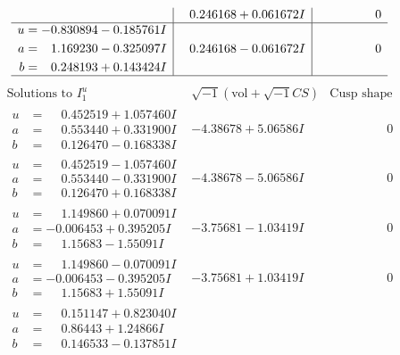 \documentclass[1p]{elsarticle_modified}
\theoremstyle{definition}
\newcommand{\I}{\sqrt{-1}}
\begin{document}
$$\begin{array}{c|c|c}
 & \phantom{-}0.246168 + 0.061672 I & \phantom{-0.000000 } 0 \\ \hline\begin{aligned}
u &= -0.830894 - 0.185761 I \\
a &= \phantom{-}1.169230 - 0.325097 I \\
b &= \phantom{-}0.248193 + 0.143424 I\end{aligned}
 & \phantom{-}0.246168 - 0.061672 I & \phantom{-0.000000 } 0\\
 \hline 
 \end{array}$$\newpage$$\begin{array}{c|c|c}  
\text{Solutions to }I^u_{1}& \I (\text{vol} + \sqrt{-1}CS) & \text{Cusp shape}\\
 \hline 
\begin{aligned}
u &= \phantom{-}0.452519 + 1.057460 I \\
a &= \phantom{-}0.553440 + 0.331900 I \\
b &= \phantom{-}0.126470 - 0.168338 I\end{aligned}
 & -4.38678 + 5.06586 I & \phantom{-0.000000 } 0 \\ \hline\begin{aligned}
u &= \phantom{-}0.452519 - 1.057460 I \\
a &= \phantom{-}0.553440 - 0.331900 I \\
b &= \phantom{-}0.126470 + 0.168338 I\end{aligned}
 & -4.38678 - 5.06586 I & \phantom{-0.000000 } 0 \\ \hline\begin{aligned}
u &= \phantom{-}1.149860 + 0.070091 I \\
a &= -0.006453 + 0.395205 I \\
b &= \phantom{-}1.15683 - 1.55091 I\end{aligned}
 & -3.75681 - 1.03419 I & \phantom{-0.000000 } 0 \\ \hline\begin{aligned}
u &= \phantom{-}1.149860 - 0.070091 I \\
a &= -0.006453 - 0.395205 I \\
b &= \phantom{-}1.15683 + 1.55091 I\end{aligned}
 & -3.75681 + 1.03419 I & \phantom{-0.000000 } 0 \\ \hline\begin{aligned}
u &= \phantom{-}0.151147 + 0.823040 I \\
a &= \phantom{-}0.86443 + 1.24866 I \\
b &= \phantom{-}0.146533 - 0.137851 I\end{aligned}

\end{array}$$
\end{document}
